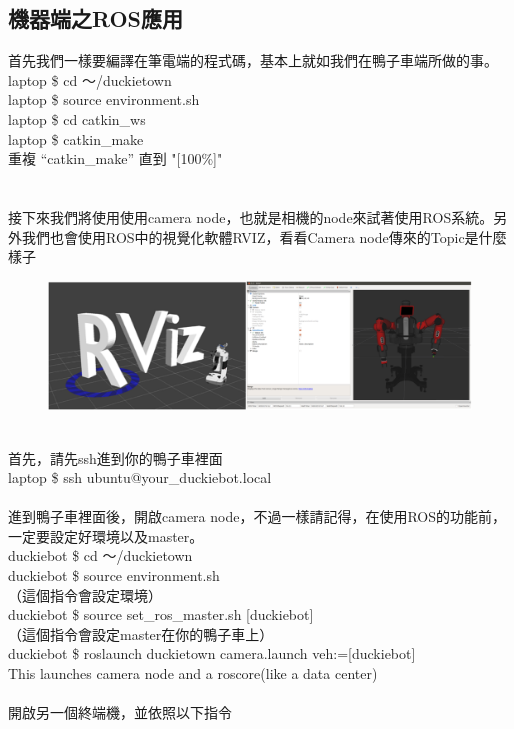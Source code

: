 \documentclass{article}
\begin{document}
\subsection{機器端之ROS應用}
首先我們一樣要編譯在筆電端的程式碼，基本上就如我們在鴨子車端所做的事。
\\laptop \$ cd ～/duckietown
\\laptop \$ source environment.sh
\\laptop \$ cd catkin\_ws
\\laptop \$ catkin\_make
\\重複 “catkin\_make” 直到 "[100\%]"
\\
\\
\\接下來我們將使用使用camera node，也就是相機的node來試著使用ROS系統。另外我們也會使用ROS中的視覺化軟體RVIZ，看看Camera node傳來的Topic是什麼樣子
\begin{figure}[htp]
    \begin{center}
        \includegraphics[width=400pt]{pic/圖片24.png}
    \end{center}
\end{figure}
\\首先，請先ssh進到你的鴨子車裡面
\\laptop \$ ssh ubuntu@your\_duckiebot.local
\\
\\進到鴨子車裡面後，開啟camera node，不過一樣請記得，在使用ROS的功能前，一定要設定好環境以及master。
\\duckiebot \$ cd ～/duckietown
\\duckiebot \$ source environment.sh
\\（這個指令會設定環境）
\\duckiebot \$ source set\_ros\_master.sh [duckiebot]
\\（這個指令會設定master在你的鴨子車上）
\\duckiebot \$ roslaunch duckietown camera.launch veh:=[duckiebot]
\\This launches camera node and a roscore(like a data center)
\\
\\開啟另一個終端機，並依照以下指令
\end{document}
